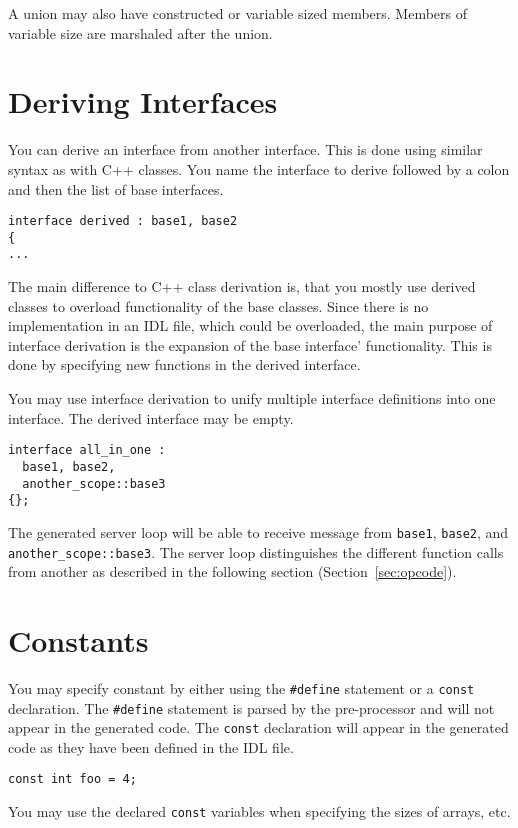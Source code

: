 A union may also have constructed or variable sized members. Members of
variable size are marshaled after the union.

\section{Deriving Interfaces}
You can derive an interface from another interface. This is done
using similar syntax as with C++ classes. You name the interface to derive
followed by a colon and then the list of base interfaces.
\begin{verbatim}
interface derived : base1, base2
{
...
\end{verbatim}

The main difference to C++ class derivation is, that you mostly use derived
classes to overload functionality of the base classes. Since there is no
implementation in an IDL file, which could be overloaded, the main purpose of
interface derivation is the expansion of the base interface' functionality.
This is done by specifying new functions in the derived interface.

You may use interface derivation to unify multiple interface definitions
into one interface. The derived interface may be empty. 
\begin{verbatim}
interface all_in_one : 
  base1, base2, 
  another_scope::base3
{};
\end{verbatim}

The generated server loop will be able to receive message from \verb|base1|,
\verb|base2|, and \verb|another_scope::base3|. The server loop distinguishes
the different function calls from another as described in the following
section (Section~\ref{sec:opcode}).

\section{Constants}

You may specify constant by either using the \verb|#define| statement or a
{\tt const} declaration. The \verb|#define| statement is parsed by the
pre-processor and will not appear in the generated code. The {\tt const}
declaration will appear in the generated code as they have been defined in the
IDL file.

\begin{verbatim}
const int foo = 4;
\end{verbatim}

You may use the declared {\tt const} variables when specifying the sizes of
arrays, etc.

